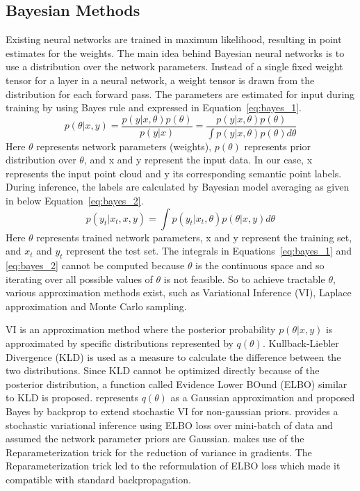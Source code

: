     \subsection{Bayesian Methods}
    Existing neural networks are trained in maximum likelihood, resulting in point estimates for the weights.
    The main idea behind Bayesian neural networks is to use a distribution over the network parameters.
    Instead of a single fixed weight tensor for a layer in a neural network, a weight tensor is drawn from the distribution for each forward pass.
    The parameters are estimated for input during training by using Bayes rule and expressed in Equation~\ref{eq:bayes_1}.
    \begin{equation}
        p(\theta|x, y) = \frac{p(y|x, \theta)p(\theta)}{p(y|x)} = \frac{p(y|x, \theta)p(\theta)}{\int p(y|x, \theta) p(\theta) d\theta} \label{eq:bayes_1}
    \end{equation}
    Here $\theta$ represents network parameters (weights), $p(\theta)$ represents prior distribution over $\theta$, and x and y represent the input data. In our case, x represents the input point cloud and y its corresponding semantic point labels.
    During inference, the labels are calculated by Bayesian model averaging as given in below Equation~\ref{eq:bayes_2}.
    \begin{equation}
        p(y_t|x_t, x, y) = \int p(y_t|x_t, \theta)p(\theta|x, y)d\theta \label{eq:bayes_2}  
    \end{equation}
    Here $\theta$ represents trained network parameters, x and y represent the training set, and $x_t$ and $y_t$ represent the test set.
    The integrals in Equations~\ref{eq:bayes_1} and \ref{eq:bayes_2} cannot be computed because $\theta$ is the continuous space and so iterating over all possible values of $\theta$ is not feasible.
    So to achieve tractable $\theta$, various approximation methods exist, such as Variational Inference (VI), Laplace approximation and Monte Carlo sampling.

    VI is an approximation method where the posterior probability $p(\theta|x, y)$ is approximated by specific distributions represented by $q(\theta)$.
    Kullback-Liebler Divergence (KLD) is used as a measure to calculate the difference between the two distributions. 
    Since KLD cannot be optimized directly because of the posterior distribution, a function called Evidence Lower BOund (ELBO) similar to KLD is proposed.
    \cite{Gaussian_Priors} represents $q(\theta)$ as a Gaussian approximation and \cite{weight_uncertainty} proposed Bayes by backprop to extend stochastic VI for non-gaussian priors.
    \cite{Non_Gaussian_Priors} provides a stochastic variational inference using ELBO loss over mini-batch of data and assumed the network parameter priors are Gaussian.
    \cite{Flipout} makes use of the Reparameterization trick for the reduction of variance in gradients. The Reparameterization trick led to the reformulation of ELBO loss which made it compatible with standard backpropagation.

